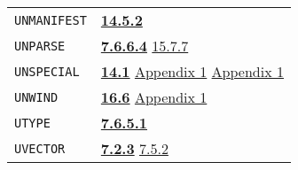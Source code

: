 \documentclass[a4paper]{scrbook}
\begin{document}
\begin{longtable}[]{@{}ll@{}}
\begin{minipage}[t]{0.24\columnwidth}\raggedright\strut
\texttt{UNMANIFEST}\strut
\end{minipage} & \begin{minipage}[t]{0.70\columnwidth}\raggedright\strut
\textbf{\href{14-data-type-declarations.md\#1452-manifest-and-unmanifest}{14.5.2}}\strut
\end{minipage}\tabularnewline
\begin{minipage}[t]{0.24\columnwidth}\raggedright\strut
\texttt{UNPARSE}\strut
\end{minipage} & \begin{minipage}[t]{0.70\columnwidth}\raggedright\strut
\textbf{\href{07-structured-objects.md\#7664-unparse-1}{7.6.6.4}} \href{15-lexical-blocking.md\#1577-pname}{15.7.7}\strut
\end{minipage}\tabularnewline
\begin{minipage}[t]{0.24\columnwidth}\raggedright\strut
\texttt{UNSPECIAL}\strut
\end{minipage} & \begin{minipage}[t]{0.70\columnwidth}\raggedright\strut
\textbf{\href{14-data-type-declarations.md\#141-patterns}{14.1}}
\href{appendix-1-a-look-inside.md\#the-control-stack}{Appendix 1}
\href{appendix-1-a-look-inside.md\#variable-bindings}{Appendix 1}\strut
\end{minipage}\tabularnewline
\begin{minipage}[t]{0.24\columnwidth}\raggedright\strut
\texttt{UNWIND}\strut
\end{minipage} & \begin{minipage}[t]{0.70\columnwidth}\raggedright\strut
\textbf{\href{16-errors-frames-etc.md\#166-unwind}{16.6}} \href{appendix-1-a-look-inside.md\#variable-bindings}{Appendix
1}\strut
\end{minipage}\tabularnewline
\begin{minipage}[t]{0.24\columnwidth}\raggedright\strut
\texttt{UTYPE}\strut
\end{minipage} & \begin{minipage}[t]{0.70\columnwidth}\raggedright\strut
\textbf{\href{07-structured-objects.md\#7651-utype-1}{7.6.5.1}}\strut
\end{minipage}\tabularnewline
\begin{minipage}[t]{0.24\columnwidth}\raggedright\strut
\texttt{UVECTOR}\strut
\end{minipage} & \begin{minipage}[t]{0.70\columnwidth}\raggedright\strut
\textbf{\href{07-structured-objects.md\#723-uvector-1}{7.2.3}} \href{07-structured-objects.md\#752-quote-1}{7.5.2}

\end{minipage}
\end{longtable}
\end{document}
